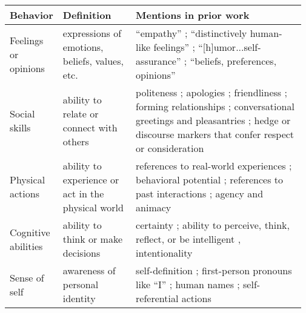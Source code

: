 \documentclass[11pt]{article}
\newcommand{\cb}{behaviors}
\begin{document}
\begin{table*}[ht!]\tiny
\setlength{\tabcolsep}{0.4em}
\centering
\begin{tabular}
{@{}p{0.12\linewidth}|p{0.25\linewidth}|p{0.6\linewidth}@{}
}
\textbf{Behavior} & \textbf{Definition}    & \textbf{Mentions in prior work}                                                                           \\\hline
Feelings or opinions       & expressions of emotions, beliefs, values, etc.                    & ``empathy'' \citep{abercrombie-etal-2023-mirages}; ``distinctively
human-like feelings'' \cite{cheng-etal-2024-anthroscore};  
``[h]umor...self-assurance'' \cite{Emnett2024-na}; ``beliefs, preferences, opinions'' \cite{Glaese2022-qo}                                                                   \\\hline
Social skills              & ability to relate or connect with others           & politeness \cite{Zamfirescu-Pereira2023-wp}; apologies \cite{De_Visser2016-dg};
friendliness \cite{Maeda2024-cv}; 
forming relationships \cite{Glaese2022-qo}; conversational greetings and pleasantries \cite{Araujo2018-ij, abercrombie-etal-2023-mirages}; hedge or discourse markers that confer respect or consideration \cite{Emnett2024-na}
\\\hline
Physical actions           & ability to experience or act in the physical world & 
references to real-world experiences \citep{Glaese2022-qo,Inie2024-dy}; behavioral potential \cite{Epley2018-yp}; references to past interactions \cite{Emnett2024-na}; agency and animacy \cite{abercrombie-etal-2023-mirages}             \\\hline
Cognitive abilities                 & ability to think or make decisions                 & certainty \cite{Kim2024-sv}; ability to perceive, think, reflect, or be intelligent  \cite{disalvo2005imitating,Araujo2018-ij,abercrombie-etal-2023-mirages,Inie2024-dy}, intentionality \cite{disalvo2005imitating}  \\\hline
Sense of self              & awareness of personal identity                    & self-definition \cite{abercrombie-etal-2023-mirages}; first-person pronouns like ``I'' \citep{gros-etal-2022-robots,cohn2024believing}; human names \citep{Araujo2018-ij,Maeda2024-cv}; self-referential actions \citep{Glaese2022-qo} \\\hline                                                                                       
\end{tabular}
\vspace{-6pt}
 \caption{\textbf{Anthropomorphic \cb~identified from prior work.} Categories of anthropomorphic \cb~presented to participants in our crowdsourcing study. Full quotes are in Table \ref{tab:priorbehaviorsfull}.
 }
 \vspace{-6pt}
\label{tab:priorbehaviors}
\end{table*}
\end{document}
